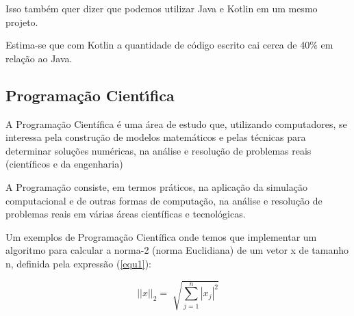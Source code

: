 Isso também quer dizer que podemos utilizar Java e Kotlin em um mesmo projeto.

Estima-se que com Kotlin a quantidade de código escrito
cai cerca de 40\% em relação ao Java. 

\subsection{ Programa\c{c}\~{a}o Cient\'{\i}fica}
A Programação Científica é uma área de estudo que,
utilizando computadores, se interessa pela
construção de modelos matemáticos e pelas técnicas 
para determinar soluções numéricas, na
análise e resolução de problemas reais
(científicos e da engenharia)

A Programação consiste, em termos práticos, na aplicação da 
simulação computacional e de outras formas de
computação, na análise e resolução de problemas 
reais em várias áreas científicas e tecnológicas.

Um exemplos de Programação Científica onde temos que implementar um 
algoritmo para calcular a norma-2 (norma Euclidiana) de um vetor x
de tamanho n, definida pela expressão (\ref*{equ1}):

\begin{center}
   \begin{equation}
      ||x||_{2} = \sqrt[]{\sum^{n}_{j=1} |x_{j}|^{2}}
      \label{equ1}
   \end{equation}
\end{center}

